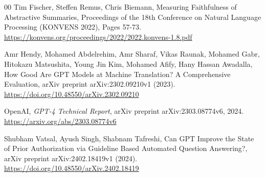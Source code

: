 \documentclass[preprint,12pt]{elsarticle}
\begin{document}
\begin{thebibliography}{00}
Tim Fischer, Steffen Remus, Chris Biemann,
Measuring Faithfulness of Abstractive Summaries,
Proceedings of the 18th Conference on Natural Language Processing (KONVENS 2022), Pages 57-73.
\href{https://konvens.org/proceedings/2022/2022.konvens-1.8.pdf}{https://konvens.org/proceedings/2022/2022.konvens-1.8.pdf}


Amr Hendy, Mohamed Abdelrehim, Amr Sharaf, Vikas Raunak, Mohamed Gabr, Hitokazu Matsushita, Young Jin Kim, Mohamed Afify, Hany Hassan Awadalla,
How Good Are GPT Models at Machine Translation? A Comprehensive Evaluation,
arXiv preprint arXiv:2302.09210v1 (2023).
\href{https://doi.org/10.48550/arXiv.2302.09210}{https://doi.org/10.48550/arXiv.2302.09210}


OpenAI,
\textit{GPT-4 Technical Report},
arXiv preprint arXiv:2303.08774v6, 2024.
\href{https://arxiv.org/abs/2303.08774v6}{https://arxiv.org/abs/2303.08774v6}

Shubham Vatsal, Ayush Singh, Shabnam Tafreshi,
Can GPT Improve the State of Prior Authorization via Guideline Based Automated Question Answering?,
arXiv preprint arXiv:2402.18419v1 (2024).
\href{https://doi.org/10.48550/arXiv.2402.18419}{https://doi.org/10.48550/arXiv.2402.18419}




\end{thebibliography}
\end{document}
